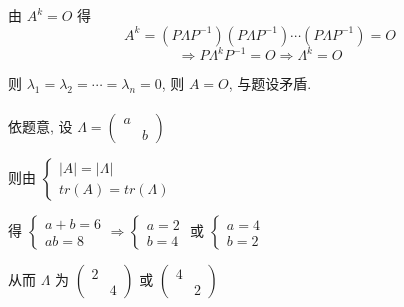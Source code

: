         由 \( A^{k} = O \) 得
         \[ A^{k} = (P\Lambda P^{-1})(P\Lambda P^{-1})\cdots(P\Lambda P^{-1}) = O \]
         \[ \Rightarrow P\Lambda^{k}P^{-1} = O \Rightarrow \Lambda^{k} = O \]

         则 \( \lambda_{1} = \lambda_{2} = \cdots = \lambda_{n} = 0 \), 则 \( A = O \), 与题设矛盾.


     \paragraph{} %
         依题意, 设 \( \Lambda = \begin{pmatrix}
             a &   \\
               & b
         \end{pmatrix} \)

         则由 \( \begin{cases}
             |A| = |\Lambda| \\
             tr(A) = tr(\Lambda)
         \end{cases} \)

         得 \( \begin{cases}
             a+b = 6 \\
             ab = 8
         \end{cases} \Rightarrow \begin{cases}
             a = 2 \\
             b = 4
         \end{cases} \) 或 \( \begin{cases}
             a = 4 \\
             b = 2
         \end{cases} \)

         从而 \( \Lambda \) 为 \( \begin{pmatrix}
             2 &   \\
               & 4
         \end{pmatrix} \) 或 \( \begin{pmatrix}
             4 &   \\
               & 2
         \end{pmatrix} \)


 \subsection{} %

